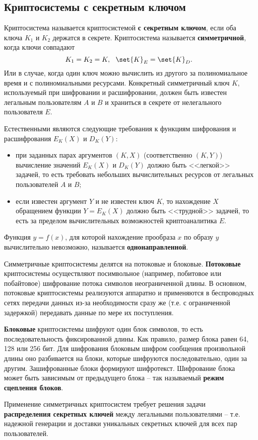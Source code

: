 \subsection{Криптосистемы с секретным ключом}

Криптосистема  называется криптосистемой \textbf{с секретным ключом}, если оба ключа $K_1$ и $K_2$ держатся в секрете.
Криптосистема называется \textbf{симметричной}, когда ключи совпадают
    \[ K_1 = K_2 = K, ~~ \set{K}_E = \set{K}_D. \]
    Или в случае, когда один ключ можно вычислить из другого за полиномиальное время и с полиномиальными ресурсами.
Конкретный симметричный ключ $K$, используемый при шифровании и расшифровании, должен быть известен легальным пользователям $A$ и $B$ и храниться в секрете от нелегального пользователя $E$.

Естественными являются следующие требования к функциям шифрования и расшифрования  $E_K(X)$ и $D_K(Y)$:
\begin{itemize}
  \item при заданных парах аргументов $(K,X)$ (соответственно $(K,Y)$) вычисление значений $E_K(X)$ и $D_K(Y)$ должно быть <<легкой>> задачей, то есть требовать небольших вычислительных ресурсов от легальных пользователей $A$ и $B$;
  \item если известен аргумент $Y$ и не известен ключ $K$, то нахождение $X$ обращением  функции $Y = E_K(X)$
      должно быть <<трудной>> задачей, то есть за пределом вычислительных возможностей криптоаналитика $E$.
\end{itemize}

Функция $y = f(x)$, для которой нахождение прообраза $x$ по образу $y$ вычислительно невозможно, называется \textbf{однонаправленной}.

Симметричные криптосистемы делятся на потоковые и блоковые. \textbf{Потоковые} криптосистемы осуществляют посимвольное (например, побитовое или побайтовое) шифрование потока символов неограниченной длины. В основном, потоковые криптосистемы реализуются аппаратно и применяются в беспроводных сетях передачи данных из-за необходимости сразу же (т.е. с ограниченной задержкой) передавать данные по мере их поступления.

\textbf{Блоковые} криптосистемы шифруют один блок символов, то есть последовательность фиксированной длины. Как правило, размер блока равен 64, 128 или 256 бит. Для шифрования блоковым шифром  сообщения произвольной длины оно разбивается на блоки, которые шифруются последовательно, один за другим. Зашифрованные блоки формируют шифротекст. Шифрование блока может быть зависимым от предыдущего блока -- так называемый \textbf{режим сцепления блоков}.

Применение симметричных криптосистем требует решения  задачи \textbf{распределения секретных ключей} между легальными пользователями -- т.е. надежной генерации и доставки уникальных секретных ключей для всех пар пользователей.
